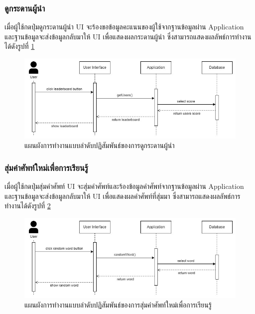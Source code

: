 \documentclass[12pt,oneside,openright,a4paper]{cpe-thai-project}
\begin{document}
\pagebreak
\subsubsection{ดูกระดานผู้นำ}
\hspace{1cm}
เมื่อผู้ใช้กดปุ่มดูกระดานผู้นำ UI จะร้องขอข้อมูลคะแนนของผู้ใช้จากฐานข้อมูลผ่าน Application
และฐานข้อมูลจะส่งข้อมูลกลับมาให้ UI เพื่อแสดงผลกระดานผู้นำ ซึ่งสามารถแสดงผลลัพธ์การทำงานได้ดังรูปที่ \ref{fig:S_Leaderboard}
\begin{figure}[!h]\centering
	\includegraphics[width=\textwidth, keepaspectratio=true]{image/chap3/sequence/Leaderboard.jpg}
	\caption{แผนผังการทำงานแบบลำดับปฏิสัมพันธ์ของการดูกระดานผู้นำ}\label{fig:S_Leaderboard}
\end{figure}


\subsubsection{สุ่มคำศัพท์ใหม่เพื่อการเรียนรู้}
\hspace{1cm}
เมื่อผู้ใช้กดปุ่มสุ่มคำศัพท์ UI จะสุ่มคำศัพท์และร้องข้อมูลคำศัพท์จากฐานข้อมูลผ่าน Application
และฐานข้อมูลจะส่งข้อมูลกลับมาให้ UI เพื่อแสดงผลคำศัพท์ที่สุ่มมา ซึ่งสามารถแสดงผลลัพธ์การทำงานได้ดังรูปที่ \ref{fig:S_RandomWord}
\begin{figure}[!h]\centering
	\includegraphics[width=\textwidth, keepaspectratio=true]{image/chap3/sequence/Random word.jpg}
	\caption{แผนผังการทำงานแบบลำดับปฏิสัมพันธ์ของการสุ่มคำศัพท์ใหม่เพื่อการเรียนรู้}\label{fig:S_RandomWord}
\end{figure}
\end{document}
